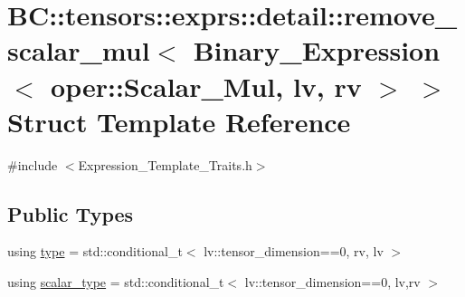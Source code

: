 \hypertarget{structBC_1_1tensors_1_1exprs_1_1detail_1_1remove__scalar__mul_3_01Binary__Expression_3_01oper_1_93122bdabcd1e75e50e91d14ca138deb}{}\section{BC\+:\+:tensors\+:\+:exprs\+:\+:detail\+:\+:remove\+\_\+scalar\+\_\+mul$<$ Binary\+\_\+\+Expression$<$ oper\+:\+:Scalar\+\_\+\+Mul, lv, rv $>$ $>$ Struct Template Reference}
\label{structBC_1_1tensors_1_1exprs_1_1detail_1_1remove__scalar__mul_3_01Binary__Expression_3_01oper_1_93122bdabcd1e75e50e91d14ca138deb}


{\ttfamily \#include $<$Expression\+\_\+\+Template\+\_\+\+Traits.\+h$>$}

\subsection*{Public Types}
\begin{DoxyCompactItemize}
\item 
using \hyperlink{structBC_1_1tensors_1_1exprs_1_1detail_1_1remove__scalar__mul_3_01Binary__Expression_3_01oper_1_93122bdabcd1e75e50e91d14ca138deb_a1a7513162e59b5996ca1dcd668405775}{type} = std\+::conditional\+\_\+t$<$ lv\+::tensor\+\_\+dimension==0, rv, lv $>$
\item 
using \hyperlink{structBC_1_1tensors_1_1exprs_1_1detail_1_1remove__scalar__mul_3_01Binary__Expression_3_01oper_1_93122bdabcd1e75e50e91d14ca138deb_aff94842c2c99bcdf2b3f661f22b6723c}{scalar\+\_\+type} = std\+::conditional\+\_\+t$<$ lv\+::tensor\+\_\+dimension==0, lv,rv $>$
\end{DoxyCompactItemize}
